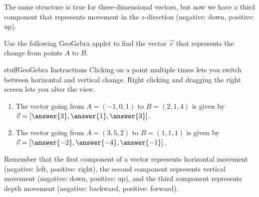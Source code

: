 \documentclass{ximera}
\begin{document}
The same structure is true for three-dimensional vectors, but now we have a third component that represents movement in the $z$-direction (negative: down, positive: up).

\begin{problem}
    Use the following GeoGebra applet to find the vector $\vec{v}$ that represents the change from points $A$ to $B$. 
    
    \begin{expandable}{stuff}{GeoGebra Instructions}
        Clicking on a point multiple times lets you switch between horizontal and vertical change. Right clicking and dragging the right screen lets you alter the view.
    \end{expandable}

    \begin{center}
    \end{center}

    \begin{enumerate}
        \item The vector going from $A=(-1,0,1)$ to $B=(2,1,4)$ is given by $\vec{v}=[\answer{3},\answer{1},\answer{3}]$.
        \item The vector going from $A=(3,5,2)$ to $B=(1,1,1)$ is given by $\vec{v}=[\answer{-2},\answer{-4},\answer{-1}]$.
    \end{enumerate}
    \begin{feedback}
        Remember that the first component of a vector represents horizontal movement (negative: left, positive: right), the second component represents vertical movement (negative: down, positive: up), and the third component represents depth movement (negative: backward, positive: forward).
    \end{feedback}
\end{problem}
\end{document}
